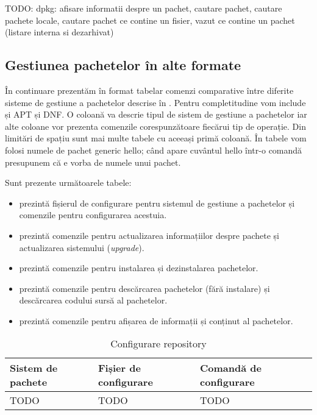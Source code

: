 \begin{screen}[caption={Operații frecvente cu rpm},label={lst:package:rpm}]
TODO: dpkg: afisare informatii despre un pachet, cautare pachet, cautare pachete locale, cautare pachet ce contine un fisier, vazut ce contine un pachet (listare interna si dezarhivat)
\end{screen}

\subsection{Gestiunea pachetelor în alte formate}
\label{sec:package:other}

În continuare prezentăm în format tabelar comenzi comparative între diferite sisteme de gestiune a pachetelor descrise în . Pentru completitudine vom include și APT și DNF. O coloană va descrie tipul de sistem de gestiune a pachetelor iar alte coloane vor prezenta comenzile corespunzătoare fiecărui tip de operație. Din limitări de spațiu sunt mai multe tabele cu aceeași primă coloană. În tabele vom folosi numele de pachet generic hello; când apare cuvântul hello într-o comandă presupunem că e vorba de numele unui pachet.

Sunt prezente următoarele tabele:
\begin{itemize}
  \item {} prezintă fișierul de configurare pentru sistemul de gestiune a pachetelor și comenzile pentru configurarea acestuia.
  \item {} prezintă comenzile pentru actualizarea informațiilor despre pachete și actualizarea sistemului (\textit{upgrade}).
  \item {} prezintă comenzile pentru instalarea și dezinstalarea pachetelor.
  \item {} prezintă comenzile pentru descărcarea pachetelor (fără instalare) și descărcarea codului sursă al pachetelor.
  \item {} prezintă comenzile pentru afișarea de informații și conținut al pachetelor.
\end{itemize}

\begin{table}[!htb]
  \caption{Configurare repository}
  \begin{center}
    \begin{tabular}{ p{} p{} p{} }
      \toprule
        \textbf{Sistem de pachete} &
        \textbf{Fișier de configurare} &
        \textbf{Comandă de configurare} \\
      \midrule
        TODO &
        TODO &
        TODO \\
      \bottomrule
    \end{tabular}
    \label{tab:package:config-repository}
  \end{center}
\end{table}

